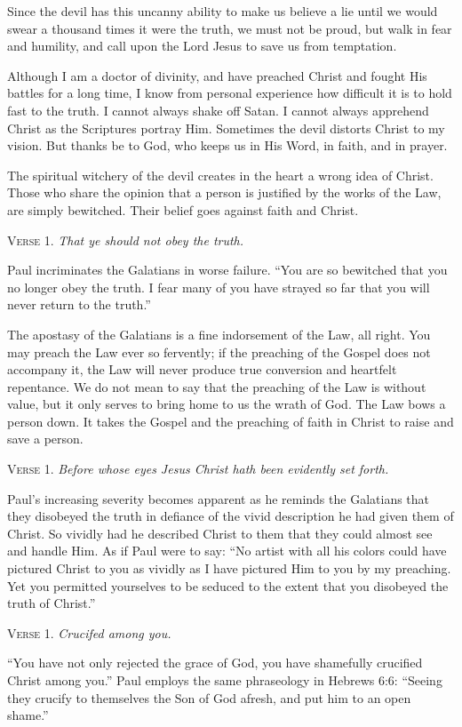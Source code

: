 Since the devil has this uncanny ability to make us believe a lie until we would swear a thousand times it were the truth, we must not be proud, but walk in fear and humility, and call upon the Lord Jesus to save us from temptation.

Although I am a doctor of divinity, and have preached Christ and fought His battles for a long time, I know from personal experience how difficult it is to hold fast to the truth. I cannot always shake off Satan. I cannot always apprehend Christ as the Scriptures portray Him. Sometimes the devil distorts Christ to my vision. But thanks be to God, who keeps us in His Word, in faith, and in prayer.

The spiritual witchery of the devil creates in the heart a wrong idea of Christ. Those who share the opinion that a person is justified by the works of the Law, are simply bewitched. Their belief goes against faith and Christ.

\textsc{Verse} 1. \emph{That ye should not obey the truth.}

Paul incriminates the Galatians in worse failure. “You are so bewitched that you no longer obey the truth. I fear many of you have strayed so far that you will never return to the truth.”

The apostasy of the Galatians is a fine indorsement of the Law, all right. You may preach the Law ever so fervently; if the preaching of the Gospel does not accompany it, the Law will never produce true conversion and heartfelt repentance. We do not mean to say that the preaching of the Law is without value, but it only serves to bring home to us the wrath of God. The Law bows a person down. It takes the Gospel and the preaching of faith in Christ to raise and save a person.

\textsc{Verse} 1. \emph{Before whose eyes Jesus Christ hath been evidently set forth.}

Paul’s increasing severity becomes apparent as he reminds the Galatians that they disobeyed the truth in defiance of the vivid description he had given them of Christ. So vividly had he described Christ to them that they could almost see and handle Him. As if Paul were to say: “No artist with all his colors could have pictured Christ to you as vividly as I have pictured Him to you by my preaching. Yet you permitted yourselves to be seduced to the extent that you disobeyed the truth of Christ.”

\textsc{Verse} 1. \emph{Crucifed among you.}

“You have not only rejected the grace of God, you have shamefully crucified Christ among you.” Paul employs the same phraseology in Hebrews 6:6: “Seeing they crucify to themselves the Son of God afresh, and put him to an open shame.”

